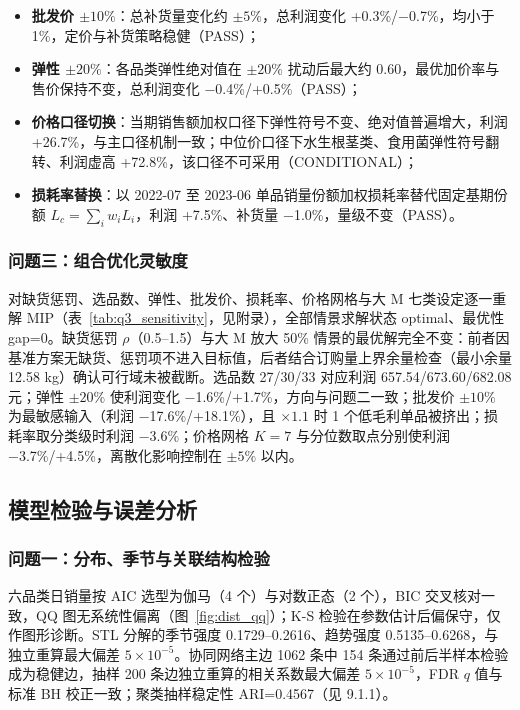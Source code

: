 \begin{itemize}
    \item \textbf{批发价 $\pm10\%$}：总补货量变化约 $\pm5\%$，总利润变化 +0.3\%/−0.7\%，均小于 1\%，定价与补货策略稳健（PASS）；
    \item \textbf{弹性 $\pm20\%$}：各品类弹性绝对值在 $\pm20\%$ 扰动后最大约 0.60，最优加价率与售价保持不变，总利润变化 −0.4\%/+0.5\%（PASS）；
    \item \textbf{价格口径切换}：当期销售额加权口径下弹性符号不变、绝对值普遍增大，利润 +26.7\%，与主口径机制一致；中位价口径下水生根茎类、食用菌弹性符号翻转、利润虚高 +72.8\%，该口径不可采用（CONDITIONAL）；
    \item \textbf{损耗率替换}：以 2022-07 至 2023-06 单品销量份额加权损耗率替代固定基期份额 $L_c=\sum_i w_i L_i$，利润 +7.5\%、补货量 −1.0\%，量级不变（PASS）。
\end{itemize}

\subsubsection{问题三：组合优化灵敏度}

对缺货惩罚、选品数、弹性、批发价、损耗率、价格网格与大 M 七类设定逐一重解 MIP（表~\ref{tab:q3_sensitivity}，见附录），全部情景求解状态 optimal、最优性 gap=0。缺货惩罚 $\rho$（0.5--1.5）与大 M 放大 50\% 情景的最优解完全不变：前者因基准方案无缺货、惩罚项不进入目标值，后者结合订购量上界余量检查（最小余量 12.58 kg）确认可行域未被截断。选品数 27/30/33 对应利润 657.54/673.60/682.08 元；弹性 $\pm20\%$ 使利润变化 −1.6\%/+1.7\%，方向与问题二一致；批发价 $\pm10\%$ 为最敏感输入（利润 −17.6\%/+18.1\%），且 $\times1.1$ 时 1 个低毛利单品被挤出；损耗率取分类级时利润 −3.6\%；价格网格 $K=7$ 与分位数取点分别使利润 −3.7\%/+4.5\%，离散化影响控制在 $\pm5\%$ 以内。

\subsection{模型检验与误差分析}

\subsubsection{问题一：分布、季节与关联结构检验}

六品类日销量按 AIC 选型为伽马（4 个）与对数正态（2 个），BIC 交叉核对一致，QQ 图无系统性偏离（图~\ref{fig:dist_qq}）；K-S 检验在参数估计后偏保守，仅作图形诊断。STL 分解的季节强度 0.1729--0.2616、趋势强度 0.5135--0.6268，与独立重算最大偏差 $5\times10^{-5}$。协同网络主边 1062 条中 154 条通过前后半样本检验成为稳健边，抽样 200 条边独立重算的相关系数最大偏差 $5\times10^{-5}$，FDR $q$ 值与标准 BH 校正一致；聚类抽样稳定性 ARI=0.4567（见 9.1.1）。

